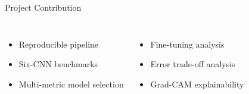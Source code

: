 \documentclass[aspectratio=169,11pt]{beamer}
\newcommand{\stepitem}{\item<+->}
\newcommand{\stepitem}{\item}
\begin{document}


\begin{frame}{Project Contribution}

\vspace{-0.3em}

\begin{columns}[T,onlytextwidth]


\begin{itemize}
  \setlength{\itemsep}{0.65em}

  \stepitem Reproducible pipeline
  \stepitem Six-CNN benchmarks
  \stepitem Multi-metric model selection
\end{itemize}


\begin{itemize}
  \setlength{\itemsep}{0.65em}

  \stepitem Fine-tuning analysis
  \stepitem Error trade-off analysis
  \stepitem Grad-CAM explainability
\end{itemize}

\end{columns}

\end{frame}
\end{document}
